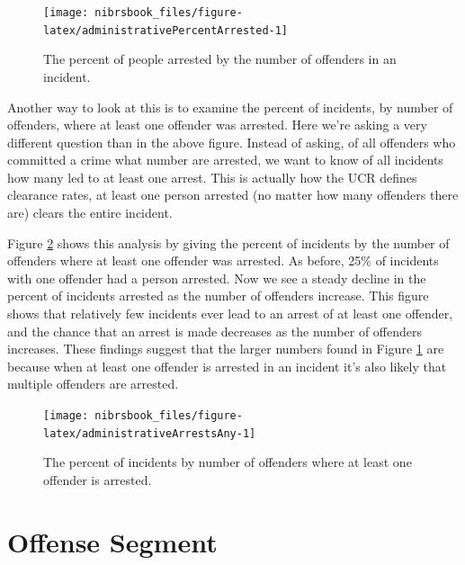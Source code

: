 \documentclass[
  12pt,
  openany]{book}
\begin{document}
\begin{figure}

{\centering \texttt{[image: nibrsbook\_files/figure-latex/administrativePercentArrested-1]} 

}

\caption{The percent of people arrested by the number of offenders in an incident.}\label{fig:administrativePercentArrested}
\end{figure}

Another way to look at this is to examine the percent of incidents, by number of offenders, where at least one offender was arrested. Here we're asking a very different question than in the above figure. Instead of asking, of all offenders who committed a crime what number are arrested, we want to know of all incidents how many led to at least one arrest. This is actually how the UCR defines clearance rates, at least one person arrested (no matter how many offenders there are) clears the entire incident.

Figure \ref{fig:administrativeArrestsAny} shows this analysis by giving the percent of incidents by the number of offenders where at least one offender was arrested. As before, 25\% of incidents with one offender had a person arrested. Now we see a steady decline in the percent of incidents arrested as the number of offenders increase. This figure shows that relatively few incidents ever lead to an arrest of at least one offender, and the chance that an arrest is made decreases as the number of offenders increases. These findings suggest that the larger numbers found in Figure \ref{fig:administrativePercentArrested} are because when at least one offender is arrested in an incident it's also likely that multiple offenders are arrested.

\begin{figure}

{\centering \texttt{[image: nibrsbook\_files/figure-latex/administrativeArrestsAny-1]} 

}

\caption{The percent of incidents by number of offenders where at least one offender is arrested.}\label{fig:administrativeArrestsAny}
\end{figure}

\hypertarget{offense-segment-1}{%
\chapter{Offense Segment}\label{offense-segment-1}}
\end{document}
